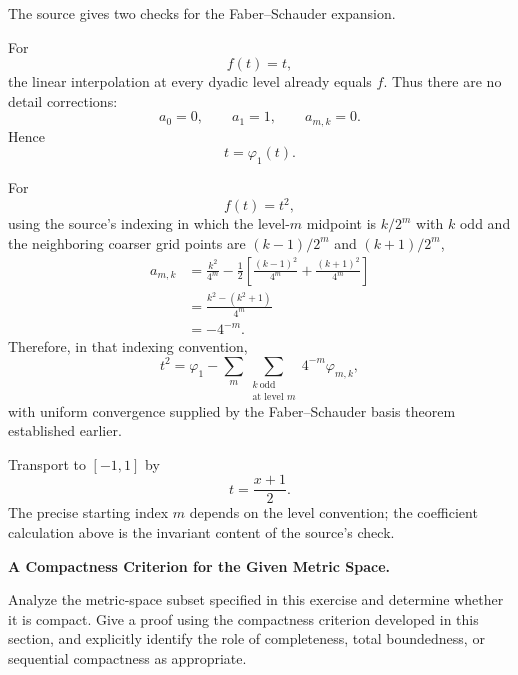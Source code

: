 \begin{solution}
The source gives two checks for the Faber--Schauder expansion.

For
\[
f(t)=t,
\]
the linear interpolation at every dyadic level already equals \(f\). Thus there are no
detail corrections:
\[
a_0=0,
\qquad
a_1=1,
\qquad
a_{m,k}=0.
\]
Hence
\[
\boxed{t=\varphi_1(t).}
\]

For
\[
f(t)=t^2,
\]
using the source's indexing in which the level-\(m\) midpoint is \(k/2^m\) with \(k\) odd
and the neighboring coarser grid points are \((k-1)/2^m\) and \((k+1)/2^m\),
\[
\begin{aligned}
a_{m,k}
&=
\frac{k^2}{4^m}
-
\frac12
\left[
\frac{(k-1)^2}{4^m}
+
\frac{(k+1)^2}{4^m}
\right]\\
&=
\frac{
k^2-(k^2+1)
}{4^m}\\
&=
-4^{-m}.
\end{aligned}
\]
Therefore, in that indexing convention,
\[
\boxed{
t^2
=
\varphi_1
-
\sum_m
\sum_{\substack{k\ \mathrm{odd}\\\text{at level }m}}
4^{-m}\varphi_{m,k},
}
\]
with uniform convergence supplied by the Faber--Schauder basis theorem established earlier.

Transport to \([-1,1]\) by
\[
t=\frac{x+1}{2}.
\]
The precise starting index \(m\) depends on the level convention; the coefficient calculation
above is the invariant content of the source's check.
\end{solution}


\begin{problem}[CP-II-0347]
\label{prob:cp-ii-0347}
\textbf{A Compactness Criterion for the Given Metric Space.}

\hspace*{1.5em}Analyze the metric-space subset specified in this exercise and determine
whether it is compact. Give a proof using the compactness criterion developed
in this section, and explicitly identify the role of completeness, total
boundedness, or sequential compactness as appropriate.
\end{problem}

